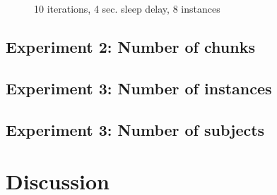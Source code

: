 \documentclass[11pt,a4paper]{article}
\begin{document}
\begin{figure}[htp]
    \centering
    
    \caption{10 iterations, 4 sec. sleep delay, 8 instances}
    \label{fig:histo_splits}
\end{figure}

\subsection{Experiment 2: Number of chunks}

\subsection{Experiment 3: Number of instances}

\subsection{Experiment 3: Number of subjects}



\section{Discussion}
\end{document}

